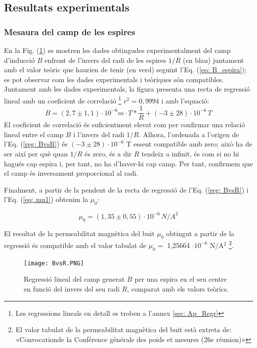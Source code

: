 \documentclass[11pt]{article}
\numberwithin{equation}{section}
\numberwithin{figure}{section}
\numberwithin{table}{section}
\begin{document}
\subsection{Resultats experimentals}\label{sec: resultats}
\subsubsection{Mesaura del camp de les espires}\label{subsec: espires}

En la Fig. (\ref{fig:BvsR}) es mostren les dades obtingudes experimentalment del camp d'inducció $B$ enfront de l'invers del radi de les espires $1/R$ (en blau) juntament amb el valor teòric que haurien de tenir (en verd) seguint l'Eq. (\ref{eq: B_espira}); es pot observar com les dades experimentals i teòriques són compatibles.
Juntament amb les dades experimentals, la figura presenta una recta de regressió lineal amb un coeficient de correlació \footnote{Les regressions lineals en detall es troben a l'annex \ref{sec: Ap_Regr}} $r^2 = 0,9994$ i amb l'equació: 
\begin{equation} \label{reg: BvsR}
    B = (2,7\pm 1,1) \cdot10^{-6} m\cdot T*\frac{1}{R}+(-3 \pm 28)\cdot10^{-6} \, T
\end{equation}
El coeficient de correlació és suficientment elevat com per confirmar una relació lineal entre el camp $B$ i l'invers del radi $1/R$.
Alhora, l'ordenada a l'origen de l'Eq. (\ref{reg: BvsR}) és $(-3 \pm 28)\cdot10^{-6}$ T essent compatible amb zero; això ha de ser així per què quan $1/R$ és zero, és a dir $R$ tendeix a infinit, és com si no hi hagués cap espira i, per tant, no ha d'haver-hi cap camp. Per tant, confirmem que el camp és inversament proporcional al radi.

Finalment, a partir de la pendent de la recta de regressió de l'Eq. (\ref{reg: BvsR}) i l'Eq. (\ref{eq: mu1}) obtenim la $\mu_0$:

\[
\boxed{\mu_0=(1,35\pm0,55)\cdot10^{-6} \, N/A^2}
\]

El resultat de la permeabilitat magnètica del buit $\mu_0$ obtingut a partir de la regressió és compatible amb el valor tabulat de $\mu_0 =$  1,25664 $\cdot 10^{-6}$ N/A$^2$ \footnote{El valor tabulat de la permeabilitat magnètica del buit està extreta de: «Convocationde la Conférence générale des poids et mesures (26e réunion)»}.

\begin{figure}[H]
    \centering
    \texttt{[image: BvsR.PNG]}
    \caption{Regressió lineal del camp generat $B$ per una espira en el seu centre en funció del invers del seu radi $R$, comparat amb els valors teòrics.}
    \label{fig:BvsR}
\end{figure}
\end{document}
